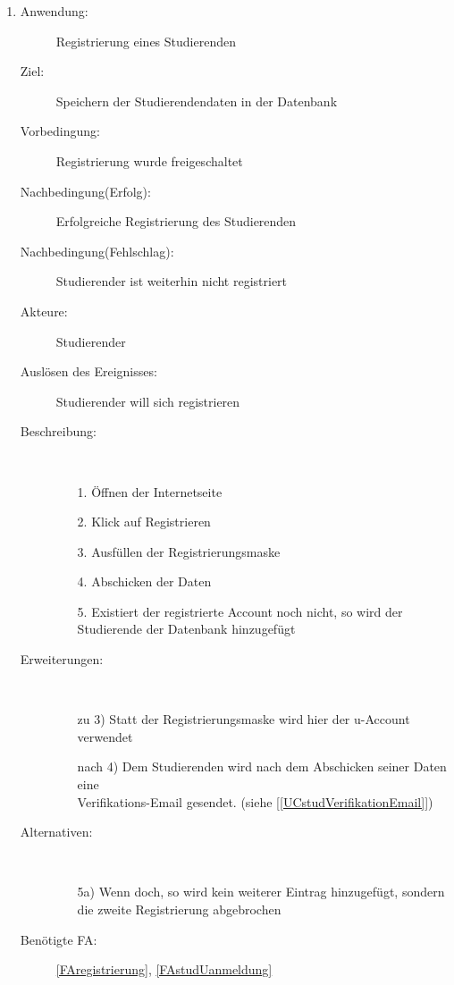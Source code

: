 \documentclass[parskip=full]{scrartcl}
\newcommand{\swtLabel}[1]{\textbf{/#1\arabic*0/}}
\newcommand{\testRef}[1]{[\ref{#1}]}
\begin{document}
\begin{enumerate}[label=\swtLabel{S}]
	\item \label{UCstudReg}
    \begin{description}
  	\item[Anwendung:] Registrierung eines Studierenden
  	\item[Ziel:] Speichern der Studierendendaten in der Datenbank
  	\item[Vorbedingung:] Registrierung wurde freigeschaltet
  	\item[Nachbedingung(Erfolg):] Erfolgreiche Registrierung des Studierenden
  	\item[Nachbedingung(Fehlschlag):] Studierender ist weiterhin nicht
  	registriert
  	\item[Akteure:] Studierender
  	\item[Auslösen des Ereignisses:] Studierender will sich registrieren
  	\item[Beschreibung:]~
  	\begin{enumerate}
  	  \item[1.] Öffnen der Internetseite
      \item[2.] Klick auf Registrieren
      \item[3.] Ausfüllen der Registrierungsmaske %
      \item[4.] Abschicken der Daten
      \item[5.] Existiert der registrierte Account noch nicht, so wird der
      Studierende der Datenbank hinzugefügt
  	\end{enumerate}
  	\item[Erweiterungen:]~
  	\begin{enumerate}
  	  \item[zu 3)] Statt der Registrierungsmaske wird hier der u-Account
  	  verwendet
  	  \item[nach 4)] Dem Studierenden wird nach dem Abschicken seiner Daten eine
  	  \\
  	  Verifikations-Email gesendet. (siehe \testRef{UCstudVerifikationEmail})
  	 \end{enumerate} 
  	\item[Alternativen:]~
  	\begin{enumerate}
  	  \item[5a)] Wenn doch, so wird kein weiterer Eintrag hinzugefügt, sondern
  	  die zweite Registrierung abgebrochen
  	\end{enumerate} 
  	\item[Benötigte FA:] \ref{FAregistrierung}, \ref{FAstudUanmeldung}
  \end{description}
%   
  

\end{enumerate}
\end{document}

